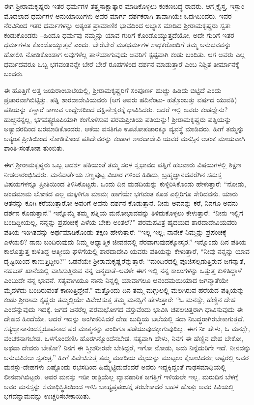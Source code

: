 ಈಗ ಶ್ರೀರಾಮಕೃಷ್ಣರು ಇತರ ಧರ್ಮಗಳ ತತ್ತ್ವಸಾಕ್ಷಾತ್ಕಾರ ಮಾಡಿಕೊಳ್ಳಲು ಕಂಕಣಬದ್ಧ ರಾದರು. ಆಗ ಕ್ರೈಸ್ತ, ಇಸ್ಲಾಂ ಮೊದಲಾದ ಧರ್ಮಗಳ ಅನುಯಾಯಿಗಳು ಅವರ ಮಾರ್ಗ ದರ್ಶಕರಾಗಿ ತಾವಾಗಿಯೇ ಒದಗಿಬಂದರು. ಇವರ ನೆರವಿನಿಂದ ಇತರ ಧರ್ಮಗಳನ್ನು ಅತ್ಯಂತ ಪ್ರಾಮಾಣಿಕ ಭಾವದಿಂದ ಅಭ್ಯಾಸ ಮಾಡಿದ ಶ್ರೀರಾಮಕೃಷ್ಣರು ಸ್ವತಃ ಕಂಡುಕೊಂಡರು –ಹಿಂದೂ ಧರ್ಮವು ನಮ್ಮನ್ನು ಯಾವ ಗುರಿಗೆ ಕೊಂಡೊಯ್ಯುತ್ತದೆಯೋ, ಅದೇ ಗುರಿಗೆ ಇತರ ಧರ್ಮಗಳೂ ಕೊಂಡೊಯ್ಯುತ್ತವೆ ಎಂದು. ಬೇರೆಬೇರೆ ಮತಧರ್ಮಗಳ ಸಾಧಕರೊಂದಿಗೆ ತಮ್ಮ ಅನುಭವವನ್ನು ಹೋಲಿಸಿ ನೋಡಿಕೊಂಡಾಗ ಅವುಗಳೆಲ್ಲ ತಾಳೆಯಾಗುವುದು ಅವರಿಗೆ ಸ್ಪಷ್ಟವಾಗಿ ಕಂಡು ಬಂದಿತು. ಆಗ ಅವರು ಎಲ್ಲ ಧರ್ಮದವರೂ ಒಬ್ಬ ಭಗವಂತನನ್ನೇ ಬೇರೆ ಬೇರೆ ರೂಪಗಳಿಂದ ದರ್ಶನ ಮಾಡುತ್ತಾರೆ ಎಂಬ ನಿಶ್ಚಿತ ತೀರ್ಮಾನಕ್ಕೆ ಬಂದರು. 

ಈ ಹೊತ್ತಿಗೆ ಅತ್ತ ಜಯರಾಂಬಾಟಿಯಲ್ಲಿ, ಶ್ರೀರಾಮಕೃಷ್ಣರಿಗೆ ಸಂಪೂರ್ಣ ಹುಚ್ಚು ಹಿಡಿದು ಬಿಟ್ಟಿದೆ ಎಂದು ಪ್ರಚಾರವಾಗಿಬಿಟ್ಟಿತ್ತು. ಪತ್ನಿ ಶಾರದಾದೇವಿಯವರು (ಆಗ ಅವರು ಹದಿನೆಂಟು- ಹತ್ತೊಂಬತ್ತು ವರ್ಷದ ಯುವತಿ) ಪತಿಯನ್ನು ಕಣ್ಣಾರೆ ಕಾಣುವ ಉದ್ದೇಶದಿಂದ ದಕ್ಷಿಣೇಶ್ವರಕ್ಕೆ ಧಾವಿಸಿದರು. ಆದರೆ ಇಲ್ಲಿ ಅವರು ಕಂಡದ್ದೇನು? ಹುಚ್ಚನನ್ನಲ್ಲ, ಭಗವತ್ಸ್ವರೂಪಿಯಾಗಿ ಕಂಗೊಳಿಸುವ ಪರಮಪ್ರೀತಿಯ ಪತಿಯನ್ನು! ಶ್ರೀರಾಮಕೃಷ್ಣರು ಪತ್ನಿಯನ್ನು ಅತ್ಯಾದರದಿಂದ ಬರಮಾಡಿಕೊಂಡರು. ಆಕೆಯ ವಸತಿಗೂ ಊಟೋಪಚಾರಕ್ಕೂ ವ್ಯವಸ್ಥೆ ಮಾಡಿದರು. ಹೀಗೆ ತಮ್ಮನ್ನು ಅತ್ಯಂತ ಪ್ರೀತಿಯಿಂದ ನೋಡಿಕೊಂಡ ಪತಿದೇವರನ್ನು ಕಂಡಾಗ ಶಾರದಾದೇವಿ ಯವರ ಮನಸ್ಸಿನ ಆತಂಕ ಮಾಯವಾಗಿ ಶಾಂತಿ-ಸಂತೋಷ ತುಂಬಿತು.

ಈಗ ಶ್ರೀರಾಮಕೃಷ್ಣರು ಒಬ್ಬ ಆದರ್ಶ ಪತಿಯಂತೆ ತಮ್ಮ ಸರಳ ಸ್ವಭಾವದ ಪತ್ನಿಗೆ ಹಲವಾರು ವಿಷಯಗಳಲ್ಲಿ ಶಿಕ್ಷಣ ನೀಡಲಾರಂಭಿಸಿದರು. ಮನೆವಾರ್ತೆಯ ಸಣ್ಣಪುಟ್ಟ ವಿಚಾರ ಗಳಿಂದ ಹಿಡಿದು, ಬ್ರಹ್ಮಜ್ಞಾನದವರೆಗಿನ ಸಮಸ್ತ ವಿಷಯಗಳನ್ನೂ ಪ್ರೀತಿಯಿಂದ ತಿಳಿಸಿಕೊಟ್ಟರು. ಒಂದು ದಿನ ಮಡದಿಯನ್ನು ಕುಳ್ಳಿರಿಸಿಕೊಂಡು ಹೇಳುತ್ತಾರೆ: “ನೋಡು, ಚಂದಮಾಮ ಲೋಕದ ಎಲ್ಲ ಮಕ್ಕಳಿಗೂ ಮಾಮ; ಹಾಗೆಯೇ ಭಗವಂತ ಕೂಡ ಎಲ್ಲಿರಿಗೂ ಸೇರಿದವನು. ಯಾರು ಆತನನ್ನು ಕೂಗಿ ಕರೆಯುತ್ತಾರೋ ಅವರಿಗೆ ಅವನು ದರ್ಶನ ಕೊಡುತ್ತಾನೆ. ನೀನು ಅವನನ್ನು ಕರೆ, ನಿನಗೂ ಅವನು ದರ್ಶನ ಕೊಡುತ್ತಾನೆ.” ಇನ್ನೊಮ್ಮೆ ತಮ್ಮ ಪತ್ನಿಯ ಮನೋಭಾವವನ್ನು ತಿಳಿದುಕೊಳ್ಳಲು ಕೇಳುತ್ತಾರೆ: “ನೀನು ಇಲ್ಲಿಗೆ ಬಂದಿದ್ದೀಯಲ್ಲ, ನನ್ನನ್ನು ಪ್ರಪಂಚಕ್ಕೆ ಎಳೆಯ ಬೇಕು ಅಂತಲೆ?” ಪರಮಪವಿತ್ರ ಹೃದಯದ ಶಾರದಾದೇವಿಯವರು ಪತಿಯ ಇಂಗಿತವನ್ನು ಅರ್ಥಮಾಡಿಕೊಂಡು ತಕ್ಷಣ ಹೇಳುತ್ತಾರೆ: “ಇಲ್ಲ ಇಲ್ಲ; ನಾನೇಕೆ ನಿಮ್ಮನ್ನು ಪ್ರಪಂಚಕ್ಕೆ ಎಳೆಯಲಿ? ನಾನು ಬಂದಿರುವುದು ನಿಮ್ಮ ಆಧ್ಯಾತ್ಮಿಕ ಜೀವನದಲ್ಲಿ ನೆರವಾಗುವುದಕ್ಕೋಸ್ಕರ.” ಇನ್ನೊಂದು ದಿನ ಪತಿಯ ಕಾಲೊತ್ತುತ್ತ ಕುಳಿತಿದ್ದ ಆತ್ಮೀಯ ಘಳಿಗೆಯಲ್ಲಿ ಶಾರದಾದೇವಿ ಯವರು ಪತಿಯನ್ನು ಕೇಳುತ್ತಾರೆ, “ನೀವು ನನ್ನನ್ನು ಯಾವ ದೃಷ್ಟಿಯಿಂದ ಕಾಣುತ್ತಿದ್ದೀರಿ?” ಒಡನೆಯೇ ಶ್ರೀರಾಮಕೃಷ್ಣರೆನ್ನುತ್ತಾರೆ: “ಮಂದಿರದಲ್ಲಿ ಪೂಜಿಸಲ್ಪಡುತ್ತಿರುವ ಜಗನ್ಮಾತೆ, ನಹಬತ್ ಖಾನೆಯಲ್ಲಿ ವಾಸಿಸುತ್ತಿರುವ ನನ್ನ ಜನ್ಮದಾತೆ–ಅವಳೇ ಈಗ ಇಲ್ಲಿ ನನ್ನ ಕಾಲುಗಳನ್ನು ಒತ್ತುತ್ತ ಕುಳಿತಿದ್ದಾಳೆ ಎಂಬುದೇ ನನ್ನ ಭಾವನೆ. ಸತ್ಯವಾಗಿಯೂ ನಾನು ನಿನ್ನಲ್ಲಿ ಯಾವಾಗಲೂ ಆನಂದಮಯಿಯಾದ ಜಗನ್ಮಾತೆಯೇ ಮೈದಳೆದು ಬಂದಿರುವಂತೆ ಕಾಣುತ್ತಿದ್ದೇನೆ.” ಮತ್ತೊಂದು ದಿನ ತಮ್ಮ ಮಗ್ಗುಲಲ್ಲಿ ಮಲಗಿರುವ ಹರೆಯದ ಪತ್ನಿಯನ್ನು ಕಂಡು ಶ್ರೀರಾಮ ಕೃಷ್ಣರು ತಮ್ಮಲ್ಲಿಯೇ ವಿವೇಚಿಸುತ್ತ ತಮ್ಮ ಮನಸ್ಸಿಗೆ ಹೇಳುತ್ತಾರೆ: “ಓ ಮನಸ್ಸೇ, ಹೆಣ್ಣಿನ ದೇಹ ಎಂದೆನ್ನುವುದು ಇದಕ್ಕೆ. ಜಗದ ಜನರೆಲ್ಲ ಪರಮಭೋಗದ ವಸ್ತುವೆಂದು ಭಾವಿಸಿ ಚಪಲಚಿತ್ತರಾಗಿ ಧಾವಿಸುವುದು ಈ ದೇಹದ ಹಿಂದೆಯೇ. ಆದರೆ ಇದನ್ನು ಅಂಗೀಕರಿಸಿದರೆ ದೇಹ ಬುದ್ಧಿಯ ಬಲೆಯಲ್ಲಿ ಸದಾ ನಿಬದ್ಧರಾಗಿರಬೇಕಾಗುತ್ತದೆ. ಸತ್ಯಜ್ಞಾನಾನಂದಸ್ವರೂಪನಾದ ಪರ ಮಾತ್ಮನನ್ನು ಎಂದಿಗೂ ಪಡೆಯುವುದಕ್ಕಾಗುವುದಿಲ್ಲ. ಈಗ ನೀ ಹೇಳು, ಓ ಮನಸ್ಸೇ, ವಂಚಕನಾಗಬೇಡ. ಒಳಗೊಂದೆಣಿಸಿ ಹೊರಗಿನ್ನೊಂದೆನಬೇಡ. ಸತ್ಯವಾಗಿ ಹೇಳು, ನಿನಗೆ ಈ ಹೆಣ್ಣಿನ ದೇಹ ಬೇಕೋ, ಅಥವಾ ದೇವರು ಬೇಕೋ? ನಿನಗೆ ಈ ಸ್ತ್ರೀಶರೀರವೇ ಬೇಕಿದ್ದರೆ, ಇಗೋ ನೋಡು, ಅದು ನಿನ್ನೆದುರಿಗೇ ಇದೆ. ನೀನದನ್ನು ಅನುಭವಿಸಲು ಸ್ವತಂತ್ರ.” ಹೀಗೆ ವಿವೇಚಿಸುತ್ತ ತಮ್ಮ ಮಡದಿಯ ಮೈಯನ್ನು ಮುಟ್ಟಲು ಕೈಚಾಚಿದರು; ಅಷ್ಟರಲ್ಲಿ ಅವರ ಮನಸ್ಸು-ದೇಹಗಳು ಎಷ್ಟೊಂದು ರಭಸದಿಂದ ಹಿಮ್ಮೆಟ್ಟಿದುವೆಂದರೆ ಅವರು ಇದ್ದಕ್ಕಿದ್ದಂತೆ ಗಾಢಸಮಾಧಿಯಲ್ಲಿ ಲೀನವಾಗಿಬಿಟ್ಟರು. ಅವರ ಮನಸ್ಸು ಇಡೀ ರಾತ್ರಿಯೆಲ್ಲ ವ್ಯಾವಹಾರಿಕ ಜಗತ್ತಿಗೆ ಇಳಿಯಲೇ ಇಲ್ಲ. ಮರುದಿನ ಬೆಳಗ್ಗೆ ಅವರ ಮನಸ್ಸನ್ನು ಸಮಾಧಿಸ್ಥಿತಿಯಿಂದ ಇಳಿಸಿ ಬಾಹ್ಯಪ್ರಪಂಚಕ್ಕೆ ತರಬೇಕಾದರೆ ಬಹಳ ಹೊತ್ತು ಅವರ ಕಿವಿಯಲ್ಲಿ ಭಗವನ್ನಾಮವನ್ನು ಉಚ್ಚರಿಸಬೇಕಾಯಿತು.

